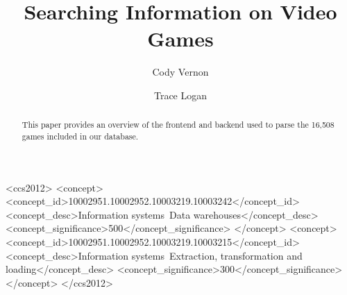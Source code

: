 \documentclass[sigconf]{acmart}
\begin{document}
\title{Searching Information on Video Games}
\subtitle{}

\author{Cody Vernon}

\author{Trace Logan}


\begin{abstract}
This paper provides an overview of the frontend and backend used to parse the 16,508 games included in our database.
\end{abstract}

%
%
\begin{CCSXML}
<ccs2012>
<concept>
<concept_id>10002951.10002952.10003219.10003242</concept_id>
<concept_desc>Information systems~Data warehouses</concept_desc>
<concept_significance>500</concept_significance>
</concept>
<concept>
<concept_id>10002951.10002952.10003219.10003215</concept_id>
<concept_desc>Information systems~Extraction, transformation and loading</concept_desc>
<concept_significance>300</concept_significance>
</concept>
</ccs2012>
\end{CCSXML}





\maketitle


\end{document}
